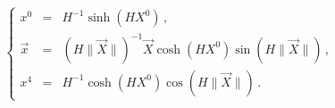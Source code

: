 \begin{equation}
\left \{\begin{array}{rcllr}
x^0&=&  {\displaystyle H^{-1} \sinh (H X^0) }    \,,\\
\vec x &=&( H\parallel \vec X\parallel)^{-1}\vec X \cosh( HX^0)
\sin
(H\parallel \vec X\parallel) \,,\\
x^4&=&  H^{-1}\cosh( HX^0) \cos (H\parallel \vec X\parallel)\,.
\end{array}
\right.
\end{equation}

